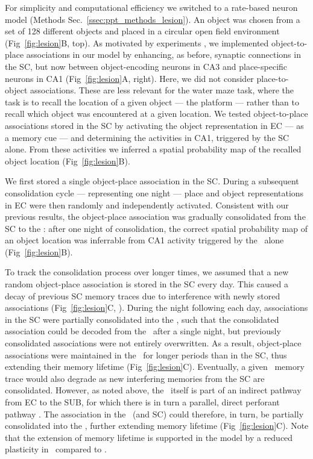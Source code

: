 For simplicity and computational efficiency we switched to a rate-based neuron model (Methods Sec.~\ref{ssec:ppt_methods_lesion}). An object was chosen from a set of 128 different objects and placed in a circular open field environment (Fig~\ref{fig:lesion}B, top).
As motivated by experiments \cite{Brun2002, Nakazawa2003, Nakashiba2008}, we implemented object-to-place associations in our model by enhancing, as before, synaptic connections in the SC, but now between object-encoding neurons in CA3 and place-specific neurons in CA1 (Fig~\ref{fig:lesion}A, right). Here, we did not consider place-to-object associations. These are less relevant for the water maze task, where the task is to recall the location of a given object --- the platform --- rather than to recall which object was encountered at a given location. We tested object-to-place associations stored in the SC by activating the object representation in EC --- as a memory cue --- and determining the activities in CA1, triggered by the SC alone.
From these activities we inferred a spatial probability map of the recalled object location (Fig~\ref{fig:lesion}B).

We first stored a single object-place association in the SC. During a subsequent consolidation  cycle --- representing one night --- place and object representations in EC were then randomly and independently activated.
Consistent with our previous results, the object-place association was gradually consolidated from the SC to the \ppca: after one night of consolidation, the correct spatial probability map of an object location was inferrable from CA1 activity triggered by the \ppca~alone (Fig~\ref{fig:lesion}B).

To track the consolidation process over longer times, we assumed that a new random object-place association is stored in the SC every day.
This caused a decay of previous SC memory traces due to interference with newly stored associations (Fig~\ref{fig:lesion}C, \cite{Lux2016, Fusi2007}).
During the night following each day, associations in the SC were partially consolidated into the \ppca, such that the consolidated association could be decoded from the \ppca~after a single night, but previously consolidated associations were not entirely overwritten.
As a result, object-place associations were maintained in the \ppca~for longer periods than in the SC, thus extending their memory lifetime (Fig~\ref{fig:lesion}C).
Eventually, a  given \ppca~memory trace would also degrade as new interfering memories from the SC are consolidated.
However, as noted above, the \ppca~itself is part of an indirect pathway from EC to the SUB, for which there is in turn a parallel, direct perforant pathway \ppsub.
The association in the \ppca~(and SC) could therefore, in turn, be partially consolidated into the \ppsub, further extending memory lifetime (Fig~\ref{fig:lesion}C).
Note that the extension of memory lifetime is supported in the model by a reduced plasticity in \ppsub\ compared to \ppca.

